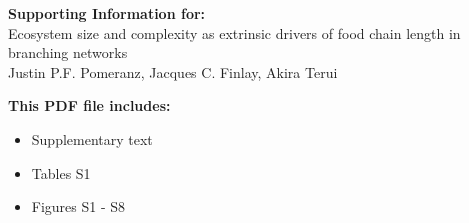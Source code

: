 \begin{center}
\vspace*{5mm}
\LARGE{\textbf{Supporting Information for:}}\\[7.5mm]
\LARGE{Ecosystem size and complexity as extrinsic drivers of food chain length in branching networks}\\[7.5mm]
\large{Justin P.F. Pomeranz, Jacques C. Finlay, Akira Terui}\\[7.5mm]
\end{center}
\begin{flushleft}
\textbf{This PDF file includes:}
\begin{itemize}
\item Supplementary text
\item Tables S1
\item Figures S1 - S8
\end{itemize}
\end{flushleft}

\newpage